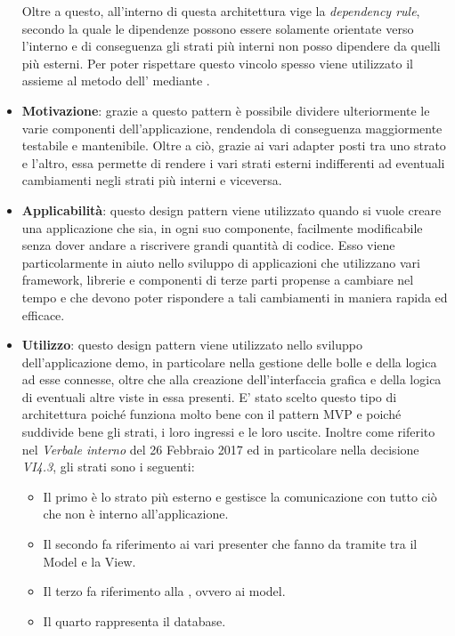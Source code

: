 \begin{itemize}
	Oltre a questo, all'interno di questa architettura vige la \textit{dependency rule}, secondo la quale le dipendenze possono essere solamente orientate verso l'interno e di conseguenza gli strati più interni non posso dipendere da quelli più esterni. Per poter rispettare questo vincolo spesso viene utilizzato il  assieme al metodo dell' mediante .
	\item \textbf{Motivazione}: grazie a questo pattern è possibile dividere ulteriormente le varie componenti dell'applicazione, rendendola di conseguenza maggiormente testabile e mantenibile. Oltre a ciò, grazie ai vari adapter posti tra uno strato e l'altro, essa permette di rendere i vari strati esterni indifferenti ad eventuali cambiamenti negli strati più interni e viceversa.
	\item \textbf{Applicabilità}: questo design pattern viene utilizzato quando si vuole creare una applicazione che sia, in ogni suo componente, facilmente modificabile senza dover andare a riscrivere grandi quantità di codice. Esso viene particolarmente in aiuto nello sviluppo di applicazioni che utilizzano vari framework, librerie e componenti di terze parti propense a cambiare nel tempo e che devono poter rispondere a tali cambiamenti in maniera rapida ed efficace.
	\item \textbf{Utilizzo}: questo design pattern viene utilizzato nello sviluppo dell'applicazione demo, in particolare nella gestione delle bolle e della logica ad esse connesse, oltre che alla creazione dell'interfaccia grafica e della logica di eventuali altre viste in essa presenti. E' stato scelto questo tipo di architettura poiché funziona molto bene con il pattern MVP e poiché suddivide bene gli strati, i loro ingressi e le loro uscite. Inoltre come riferito nel \textit{Verbale interno} del 26 Febbraio 2017 ed in particolare nella decisione \textit{VI4.3}, gli strati sono i seguenti:
\begin{itemize}
\item Il primo è lo strato più esterno e gestisce la comunicazione con tutto ciò che non è interno all'applicazione.
\item Il secondo fa riferimento ai vari presenter che fanno da tramite tra il Model e la View.
\item Il terzo fa riferimento alla , ovvero ai model.
\item Il quarto rappresenta il database.
\end{itemize}
\end{itemize}
 